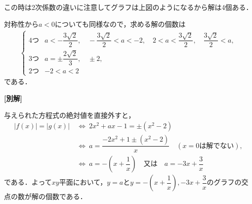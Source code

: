 \documentclass[../../main.tex]{subfiles}
\begin{document}
この時は2次係数の違いに注意してグラフは上図のようになるから解は4個ある．
\casesend

対称性から$a<0$についても同様なので，求める解の個数は
\begin{align}
  \begin{cases}
    4\text{つ}&a<-\dfrac{3\sqrt{2}}{2},\quad-\dfrac{3\sqrt{2}}{2}<a<-2,\quad
    2<a<\dfrac{3\sqrt{2}}{2},\quad\dfrac{3\sqrt{2}}{2}<a,\\
    3\text{つ}& a=\pm\dfrac{2\sqrt{2}}{3},\quad\pm2,\\
    2\text{つ}& -2<a<2
  \end{cases}
\end{align}
である．

{\bf [別解]}

与えられた方程式の絶対値を直接外すと，
\begin{align}
  |f(x)|=|g(x)|
  &\ \Longleftrightarrow\ 2x^2+ax-1=\pm(x^2-2)\\
  &\ \Longleftrightarrow\ a=\dfrac{-2x^2+1\pm(x^2-2)}{x}\quad(x=0\text{は解でない}),\\
  &\ \Longleftrightarrow\ a=-\left(x+\dfrac{1}{x}\right)\quad\text{又は}\quad
  a=-3x+\dfrac{3}{x}
\end{align}
である．よって$xy$平面において，$y=a$と$y=-\left(x+\dfrac{1}{x}\right), -3x+\dfrac{3}{x}$のグラフの交点の数が解の個数である．
\end{document}

